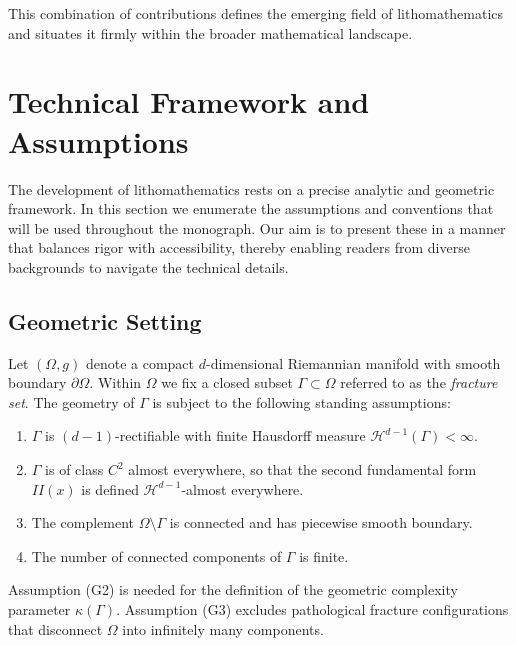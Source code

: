 This combination of contributions defines the emerging field of
lithomathematics and situates it firmly within the broader mathematical
landscape.


\section{Technical Framework and Assumptions}

The development of lithomathematics rests on a precise analytic and geometric
framework. In this section we enumerate the assumptions and conventions that
will be used throughout the monograph. Our aim is to present these in a manner
that balances rigor with accessibility, thereby enabling readers from diverse
backgrounds to navigate the technical details.

\subsection{Geometric Setting}

Let $(\Omega,g)$ denote a compact $d$-dimensional Riemannian manifold with
smooth boundary $\partial\Omega$. Within $\Omega$ we fix a closed subset
$\Gamma \subset \Omega$ referred to as the \emph{fracture set}. The geometry of
$\Gamma$ is subject to the following standing assumptions:

\begin{enumerate}[label=(G\arabic*)]
  \item $\Gamma$ is $(d-1)$-rectifiable with finite Hausdorff measure
  $\mathcal{H}^{d-1}(\Gamma)<\infty$.
  \item $\Gamma$ is of class $C^2$ almost everywhere, so that the second
  fundamental form $II(x)$ is defined $\mathcal{H}^{d-1}$-almost everywhere.
  \item The complement $\Omega\setminus\Gamma$ is connected and has piecewise
  smooth boundary.
  \item The number of connected components of $\Gamma$ is finite.
\end{enumerate}

Assumption (G2) is needed for the definition of the geometric complexity
parameter $\kappa(\Gamma)$. Assumption (G3) excludes pathological fracture
configurations that disconnect $\Omega$ into infinitely many components.

